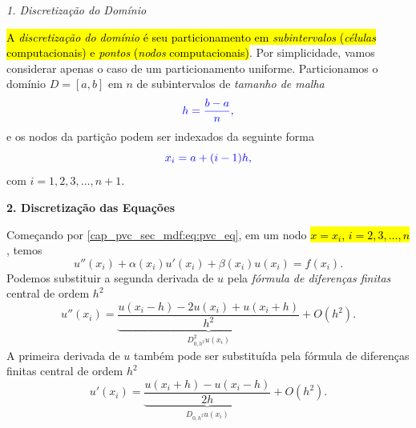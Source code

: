 \begin{flushleft}
  \emph{1. Discretização do Domínio}
\end{flushleft}

\hl{A \emph{discretização do domínio} é seu particionamento em \emph{subintervalos} (\emph{células} computacionais) e \emph{pontos} (\emph{nodos} computacionais)}. Por simplicidade, vamos considerar apenas o caso de um particionamento uniforme. Particionamos o domínio $D = [a, b]$ em $n$ de subintervalos de \emph{tamanho de malha}
\begin{equation}\color{blue}h = \frac{b-a}{n},
\end{equation}
e os nodos da partição podem ser indexados da seguinte forma
\begin{equation}\color{blue}x_i = a + (i-1)h,
\end{equation}
com $i = 1, 2, 3, \dotsc, n+1$.

\begin{flushleft}
  {\bf 2. Discretização das Equações}
\end{flushleft}

Começando por \eqref{cap_pvc_sec_mdf:eq:pvc_eq}, em um nodo \hl{$x=x_i$, $i=2, 3, \dotsc, n$}, temos
\begin{equation}\label{cap_pvc_sec_mdf:eq:pvc_eq_no_ponto}
  u''(x_i) + \alpha(x_i) u'(x_i) + \beta(x_i) u(x_i) = f(x_i).
\end{equation}
Podemos substituir a segunda derivada de $u$ pela \emph{fórmula de diferenças finitas} central de ordem $h^2$
\begin{equation}
  u''(x_i) = \underbrace{\frac{u(x_i-h) - 2u(x_i) + u(x_i+h)}{h^2}}_{D^2_{0,h^2}u(x_i)} + O(h^2).
\end{equation}
A primeira derivada de $u$ também pode ser substituída pela fórmula de diferenças finitas central de ordem $h^2$
\begin{equation}
  u'(x_i) = \underbrace{\frac{u(x_i+h)-u(x_i-h)}{2h}}_{D_{0,h^2}u(x_i)} + O(h^2).
\end{equation}

